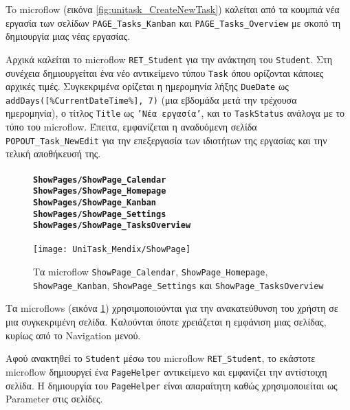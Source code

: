                 To microflow (εικόνα \ref{fig:unitask_CreateNewTask}) καλείται από τα κουμπιά {\Zona νέα εργασία} των σελίδων \texttt{PAGE\_Tasks\_Kanban} και \texttt{PAGE\_Tasks\_Overview} με σκοπό τη δημιουργία μιας νέας εργασίας.

                Αρχικά καλείται το microflow \texttt{RET\_Student} για την ανάκτηση του \texttt{Student}. Στη συνέχεια δημιουργείται ένα νέο αντικείμενο τύπου \texttt{Task} όπου ορίζονται κάποιες αρχικές τιμές. Συγκεκριμένα ορίζεται η ημερομηνία λήξης \texttt{DueDate} ως \linebreak \verb|addDays([%CurrentDateTime%], 7)| (μια εβδομάδα μετά την τρέχουσα ημερομηνία), ο τίτλος \texttt{Title} ως \texttt{'Νέα εργασία'}, και το \texttt{TaskStatus} ανάλογα με το τύπο του microflow. Έπειτα, εμφανίζεται η αναδυόμενη σελίδα \texttt{POPOUT\_Task\_NewEdit} για την επεξεργασία των ιδιοτήτων της εργασίας και την τελική αποθήκευσή της.

                \begin{figure}[H] \noindent
                    \paragraph{\texttt{ShowPages/ShowPage\_Calendar} \\ \texttt{ShowPages/ShowPage\_Homepage} \\ \texttt{ShowPages/ShowPage\_Kanban} \\ \texttt{ShowPages/ShowPage\_Settings} \\ \texttt{ShowPages/ShowPage\_TasksOverview}}
                    \begin{center}
                        \texttt{[image: UniTask\_Mendix/ShowPage]}
                        \caption{\centering Τα microflow \texttt{ShowPage\_Calendar}, \texttt{ShowPage\_Homepage}, \texttt{ShowPage\_Kanban}, \texttt{ShowPage\_Settings} και \texttt{ShowPage\_TasksOverview}}
                        \label{fig:unitask_ShowPage}
                    \end{center}
                \end{figure}

                Τα microflows (εικόνα \ref{fig:unitask_ShowPage}) χρησιμοποιούνται για την ανακατεύθυνση του χρήστη σε μια συγκεκριμένη σελίδα. Καλούνται όποτε χρειάζεται η εμφάνιση μιας σελίδας, κυρίως από το Navigation μενού.

                Αφού ανακτηθεί το \texttt{Student} μέσω του microflow \texttt{RET\_Student}, το εκάστοτε microflow δημιουργεί ένα \texttt{PageHelper} αντικείμενο και εμφανίζει την αντίστοιχη σελίδα. Η δημιουργία του \texttt{PageHelper} είναι απαραίτητη καθώς χρησιμοποιείται ως Parameter στις σελίδες.

